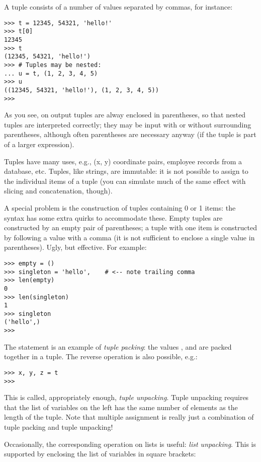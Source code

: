 A tuple consists of a number of values separated by commas, for
instance:

\bcode\begin{verbatim}
>>> t = 12345, 54321, 'hello!'
>>> t[0]
12345
>>> t
(12345, 54321, 'hello!')
>>> # Tuples may be nested:
... u = t, (1, 2, 3, 4, 5)
>>> u
((12345, 54321, 'hello!'), (1, 2, 3, 4, 5))
>>>
\end{verbatim}\ecode
%
As you see, on output tuples are alway enclosed in parentheses, so
that nested tuples are interpreted correctly; they may be input with
or without surrounding parentheses, although often parentheses are
necessary anyway (if the tuple is part of a larger expression).

Tuples have many uses, e.g., (x, y) coordinate pairs, employee records
from a database, etc.  Tuples, like strings, are immutable: it is not
possible to assign to the individual items of a tuple (you can
simulate much of the same effect with slicing and concatenation,
though).

A special problem is the construction of tuples containing 0 or 1
items: the syntax has some extra quirks to accommodate these.  Empty
tuples are constructed by an empty pair of parentheses; a tuple with
one item is constructed by following a value with a comma
(it is not sufficient to enclose a single value in parentheses).
Ugly, but effective.  For example:

\bcode\begin{verbatim}
>>> empty = ()
>>> singleton = 'hello',    # <-- note trailing comma
>>> len(empty)
0
>>> len(singleton)
1
>>> singleton
('hello',)
>>>
\end{verbatim}\ecode
%
The statement  is an example of
\emph{tuple packing}: the values ,  and
 are packed together in a tuple.  The reverse operation
is also possible, e.g.:

\bcode\begin{verbatim}
>>> x, y, z = t
>>>
\end{verbatim}\ecode
%
This is called, appropriately enough, \emph{tuple unpacking}.  Tuple
unpacking requires that the list of variables on the left has the same
number of elements as the length of the tuple.  Note that multiple
assignment is really just a combination of tuple packing and tuple
unpacking!

Occasionally, the corresponding operation on lists is useful: \emph{list
unpacking}.  This is supported by enclosing the list of variables in
square brackets:

